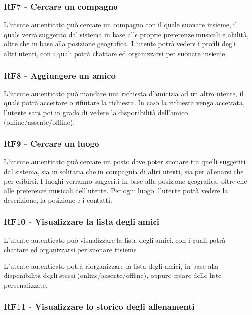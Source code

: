 \documentclass[12pt, a4paper]{article}
\begin{document}
\subsubsection*{\hypertarget{RF7}{RF7 - Cercare un compagno}}

L'utente autenticato può cercare un compagno con il quale suonare insieme, il quale verrà suggerito dal sistema in base alle proprie preferenze musicali e abilità, oltre che in base alla posizione geografica. L'utente potrà vedere i profili degli altri utenti, con i quali potrà chattare ed organizzarsi per suonare insieme.

\subsubsection*{\hypertarget{RF8}{RF8 - Aggiungere un amico}}

L'utente autenticato può mandare una richiesta d'amicizia ad un altro utente, il quale potrà accettare o rifiutare la richiesta. In caso la richiesta venga accettata, l'utente sarà poi in grado di vedere la disponibilità dell'amico (online/assente/offline).


\subsubsection*{\hypertarget{RF9}{RF9 - Cercare un luogo}}


L'utente autenticato può cercare un posto dove poter suonare tra quelli suggeriti dal sistema, sia in solitaria che in compagnia di altri utenti, sia per allenarsi che per esibirsi. I luoghi verranno suggeriti in base alla posizione geografica, oltre che alle preferenze musicali dell'utente. Per ogni luogo, l'utente potrà vedere la descrizione, la posizione e i contatti.

\subsubsection*{\hypertarget{RF10}{RF10 - Visualizzare la lista degli amici}}

L'utente autenticato può visualizzare la lista degli amici, con i quali potrà chattare ed organizzarsi per suonare insieme.


L'utente autenticato potrà riorganizzare la lista degli amici, in base alla disponibilità degli stessi (online/assente/offline), oppure creare delle liste personalizzate.


\subsubsection*{\hypertarget{RF11}{RF11 - Visualizzare lo storico degli allenamenti}}
\end{document}
